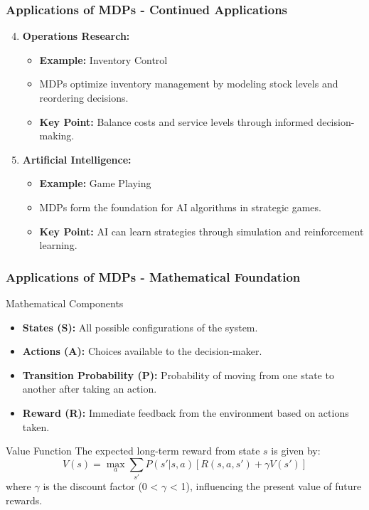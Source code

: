 \documentclass[aspectratio=169]{beamer}
\begin{document}
\begin{frame}[fragile]
    \frametitle{Applications of MDPs - Continued Applications}
    \begin{enumerate}
        \setcounter{enumi}{3}
        \item \textbf{Operations Research:}
            \begin{itemize}
                \item \textbf{Example:} Inventory Control
                \item MDPs optimize inventory management by modeling stock levels and reordering decisions.
                \item \textbf{Key Point:} Balance costs and service levels through informed decision-making.
            \end{itemize}

        \item \textbf{Artificial Intelligence:}
            \begin{itemize}
                \item \textbf{Example:} Game Playing
                \item MDPs form the foundation for AI algorithms in strategic games.
                \item \textbf{Key Point:} AI can learn strategies through simulation and reinforcement learning.
            \end{itemize}
    \end{enumerate}
\end{frame}

\begin{frame}[fragile]
    \frametitle{Applications of MDPs - Mathematical Foundation}
    \begin{block}{Mathematical Components}
        \begin{itemize}
            \item \textbf{States (S):} All possible configurations of the system.
            \item \textbf{Actions (A):} Choices available to the decision-maker.
            \item \textbf{Transition Probability (P):} Probability of moving from one state to another after taking an action.
            \item \textbf{Reward (R):} Immediate feedback from the environment based on actions taken.
        \end{itemize}
    \end{block}

    \begin{block}{Value Function}
        The expected long-term reward from state \( s \) is given by:
        \begin{equation}
            V(s) = \max_a \sum_{s'} P(s'|s, a) [R(s, a, s') + \gamma V(s')]
        \end{equation}
        where \( \gamma \) is the discount factor (0 < \( \gamma \) < 1), influencing the present value of future rewards.
    \end{block}
\end{frame}
\end{document}

